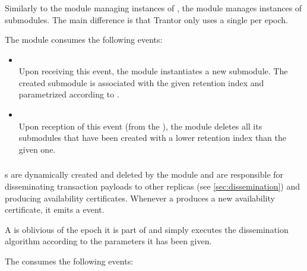 \documentclass{article}
\begin{document}
\subsubsection{}
\label{sec:module-dissemination}

Similarly to the  module managing instances of ,
the  module manages instances of  submodules.
The main difference is that Trantor only uses a single  per epoch.

The  module consumes the following events:

\begin{itemize}

    \item {}\\
    Upon receiving this event, the  module instantiates a new  submodule.
    The created submodule is associated with the given retention index and parametrized according to .

    \item {}\\
    Upon reception of this event (from the ),
    the  module deletes all its submodules that have been created with a lower retention index than the given one.

\end{itemize}

\subsubsection{}

s are dynamically created and deleted by the  module
and are responsible for disseminating transaction payloads to other replicas (see \cref{sec:dissemination})
and producing availability certificates.
Whenever a  produces a new availability certificate, it emits a  event.

A  is oblivious of the epoch it is part of
and simply executes the dissemination algorithm according to the parameters it has been given.

The  consumes the following events:
\end{document}
